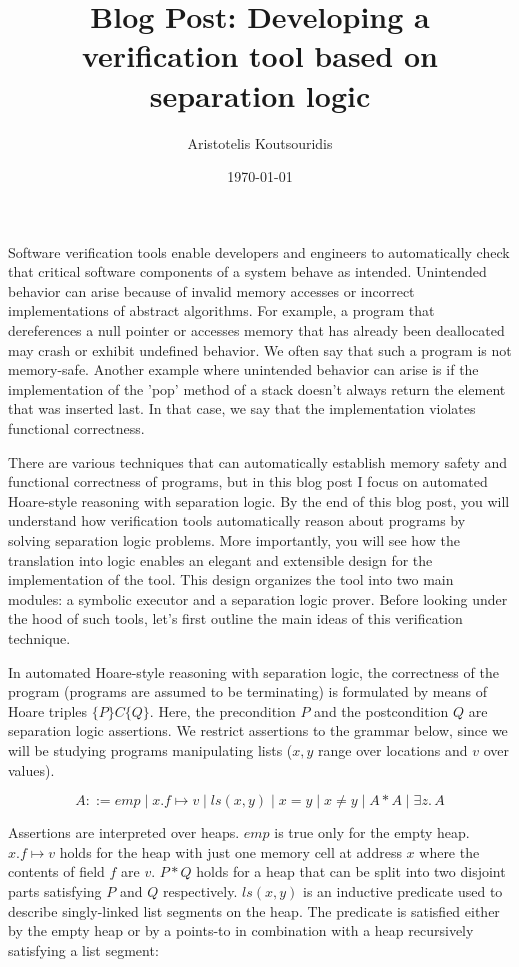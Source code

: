 \documentclass{article}
\begin{document}
\title{Blog Post: Developing a verification tool based on separation logic}
\author{Aristotelis Koutsouridis}
\date{\today}
\maketitle

Software verification tools enable developers and engineers to automatically check that critical software components of a system behave as intended.
Unintended behavior can arise because of invalid memory accesses or incorrect implementations of abstract algorithms.
For example, a program that dereferences a null pointer or accesses memory that has already been deallocated may crash or exhibit undefined behavior.
We often say that such a program is not memory-safe.
Another example where unintended behavior can arise is if the implementation of the 'pop' method of a stack doesn't always return the element that was inserted last.
In that case, we say that the implementation violates functional correctness.

There are various techniques that can automatically establish memory safety and functional correctness of programs, but
in this blog post I focus on automated Hoare-style reasoning with separation logic.
By the end of this blog post, you will understand how verification tools automatically reason about programs by solving separation logic problems.
More importantly, you will see how the translation into logic enables an elegant and extensible design for the implementation of the tool.
This design organizes the tool into two main modules: a symbolic executor and a separation logic prover.
Before looking under the hood of such tools, let's first outline the main ideas of this verification technique.

In automated Hoare-style reasoning with separation logic, the correctness of the program (programs are assumed to be terminating) is formulated by means of Hoare triples $\{P\} C \{Q\}$.
Here, the precondition $P$ and the postcondition $Q$ are separation logic assertions.
We restrict assertions to the grammar below, since we will be studying programs manipulating lists ($x,y$ range over locations and $v$ over values).

\[
	A ::= emp \mid x.f \mapsto v  \mid  ls(x,y)    \mid  x = y     \mid  x \neq y \mid  A \ast A   \mid  \exists z.\, A
\]

Assertions are interpreted over heaps.
$emp$ is true only for the empty heap.
$x.f \mapsto v$ holds for the heap with just one memory cell at address $x$ where the contents of field $f$ are $v$.
$P \ast Q$ holds for a heap that can be split into two disjoint parts satisfying $P$ and $Q$ respectively.
$ls(x,y)$ is an inductive predicate used to describe singly-linked list segments on the heap.
The predicate is satisfied either by the empty heap or by a points-to in combination with a heap recursively satisfying a list segment:
\end{document}
